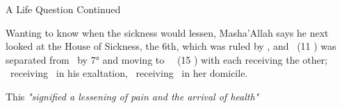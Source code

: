 \begin{frame}[t]{A Life Question Continued}

Wanting to know when the sickness would lessen, Masha'Allah says he next looked at the House of Sickness, the 6th, which was ruled by \Saturn, and \Venus\ (11 \Capricorn) was separated from \Saturn\ by 7° and moving to \Trine\ \Mars\ (15 \Taurus) with each receiving the other; \Mars\ receiving \Venus\ in his exaltation, \Venus\ receiving \Mars\ in her domicile.

This \textsl{"signified a lessening of pain and the arrival of health"}

\end{frame}
